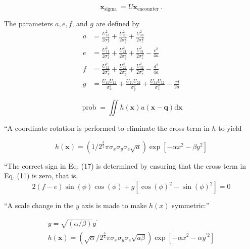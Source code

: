 \begin{equation}
    \boldsymbol{x}_{\text {sigma }}=U \boldsymbol{x}_{\text {encounter }}.
\end{equation}

The parameters $a, e, f$, and $g$ are defined by
\begin{equation}
    \begin{aligned}
        a&=\frac{U_{13}^{2}}{2 \sigma_{x}^{2}}+\frac{U_{23}^{2}}{2 \sigma_{y}^{2}}+\frac{U_{33}^{2}}{2 \sigma_{z}^{2}} \\
        e&=\frac{U_{11}^{2}}{2 \sigma_{x}^{2}}+\frac{U_{21}^{2}}{2 \sigma_{y}^{2}}+\frac{U_{31}^{2}}{2 \sigma_{z}^{2}}-\frac{c^{2}}{4 a} \\
        f&=\frac{U_{12}^{2}}{2 \sigma_{x}^{2}}+\frac{U_{22}^{2}}{2 \sigma_{y}^{2}}+\frac{U_{32}^{2}}{2 \sigma_{z}^{2}}-\frac{d^{2}}{4 a}\\
        g&=\frac{U_{11} U_{12}}{\sigma_{x}^{2}}+\frac{U_{21} U_{22}}{\sigma_{y}^{2}}+\frac{U_{31} U_{32}}{\sigma_{z}^{2}}-\frac{c d}{2 a}
\end{aligned}
\end{equation}

\begin{equation}
    \operatorname{prob}=\iint h(\boldsymbol{x}) u(\boldsymbol{x}-\boldsymbol{q}) \mathrm{d} \boldsymbol{x}
\end{equation}

``A coordinate rotation is performed to eliminate the cross term in $h$ to yield

\begin{equation}
    h(\boldsymbol{x})=\left(1 / 2^{\frac{3}{2}} \pi \sigma_{x} \sigma_{y} \sigma_{z} \sqrt{a}\right) \exp \left[-\alpha x^{2}-\beta y^{2}\right]
\end{equation}

``The correct sign in Eq. (17) is determined by ensuring that the cross term in Eq. (11) is zero, that is,
\begin{equation}
    2(f-e) \sin (\phi) \cos (\phi)+g\left[\cos (\phi)^{2}-\sin (\phi)^{2}\right]=0
\end{equation}

``A scale change in the $y$ axis is made to make $h(x)$ symmetric:''

\begin{equation}
    \begin{gathered}
        y=\sqrt{(\alpha / \beta)} y^{\prime} \\
        h(\boldsymbol{x})=\left(\sqrt{\alpha} / 2^{\frac{3}{2}} \pi \sigma_{x} \sigma_{y} \sigma_{z} \sqrt{a \beta}\right) \exp \left[-\alpha x^{2}-\alpha y^{\prime 2}\right]
    \end{gathered}
\end{equation}

